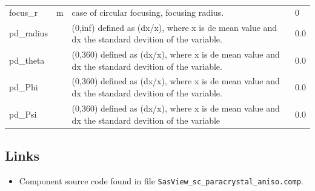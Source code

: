 \begin{longtable}{p{}p{}p{}p{}}
focus\_r & m & case of circular focusing, focusing radius. & 0 \\
pd\_radius &  & (0,inf) defined as (dx/x), where x is de mean value and dx the standard devition of the variable. & 0.0 \\
pd\_theta &  & (0,360) defined as (dx/x), where x is de mean value and dx the standard devition of the variable. & 0.0 \\
pd\_Phi &  & (0,360) defined as (dx/x), where x is de mean value and dx the standard devition of the variable. & 0.0 \\
pd\_Psi &  & (0,360) defined as (dx/x), where x is de mean value and dx the standard devition of the variable & 0.0 \\
\bottomrule
\end{longtable}

\subsection*{Links}
\begin{itemize}
  \item Component source code found in file \texttt{SasView\_sc\_paracrystal\_aniso.comp}.
\end{itemize}
